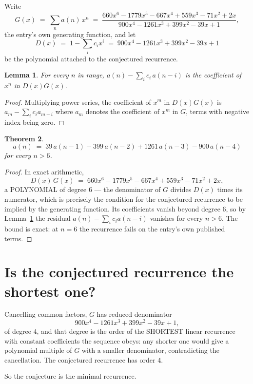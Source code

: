 \documentclass[11pt,a4paper]{article}
\theoremstyle{plain}
\newtheorem{theorem}{Theorem}
\newtheorem{lemma}[theorem]{Lemma}
\theoremstyle{definition}
\begin{document}
Write
\[
G(x)\;=\;\sum_{n}a(n)\,x^{n}\;=\;\frac{660 x^{6} - 1779 x^{5} - 667 x^{4} + 559 x^{3} - 71 x^{2} + 2 x}{900 x^{4} - 1261 x^{3} + 399 x^{2} - 39 x + 1},
\]
the entry's own generating function, and let
\[
D(x)\;=\;1-\sum_i c_i x^{i}\;=\;900 x^{4} - 1261 x^{3} + 399 x^{2} - 39 x + 1
\]
be the polynomial attached to the conjectured recurrence.

\begin{lemma}\label{lem:key}
For every $n$ in range, $a(n)-\sum_i c_i\,a(n-i)$ is the coefficient of $x^{n}$ in
$D(x)G(x)$.
\end{lemma}

\begin{proof}
Multiplying power series, the coefficient of $x^{m}$ in $D(x)G(x)$ is
$a_m-\sum_i c_i a_{m-i}$ where $a_m$ denotes the coefficient of $x^{m}$ in $G$, terms with
negative index being zero.
\end{proof}

\begin{theorem}
\[
a(n)\;=\;39\,a(n-1) - 399\,a(n-2) + 1261\,a(n-3) - 900\,a(n-4)
\]
for every $n>6$.
\end{theorem}

\begin{proof}
In exact arithmetic,
\[
D(x)\,G(x)\;=\;660 x^{6} - 1779 x^{5} - 667 x^{4} + 559 x^{3} - 71 x^{2} + 2 x,
\]
a POLYNOMIAL of degree $6$ --- the denominator of $G$ divides $D(x)$ times its numerator,
which is precisely the condition for the conjectured recurrence to be implied by the
generating function. Its coefficients vanish beyond degree $6$, so by
Lemma~\ref{lem:key} the residual $a(n)-\sum_ic_ia(n-i)$ vanishes for every
$n>6$. The bound is exact: at $n=6$ the recurrence fails on the entry's own published terms.
\end{proof}

\section{Is the conjectured recurrence the shortest one?}

Cancelling common factors, $G$ has reduced denominator
\[
900 x^{4} - 1261 x^{3} + 399 x^{2} - 39 x + 1,
\]
of degree $4$, and that degree is the order of the SHORTEST linear recurrence with
constant coefficients the sequence obeys: any shorter one would give a polynomial multiple of
$G$ with a smaller denominator, contradicting the cancellation. The conjectured recurrence has
order $4$.

So the conjecture is the minimal recurrence.
\end{document}
